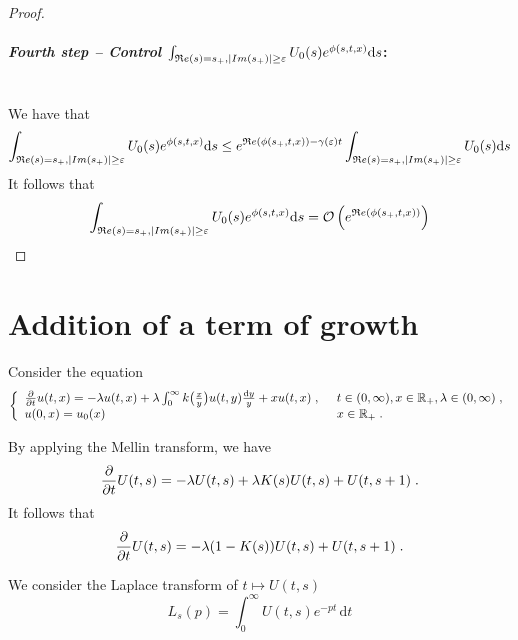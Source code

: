 \documentclass[11pt]{amsart}
\renewcommand{\Re}{\mathfrak{R}e}
\newcommand{\diff}{\,\mathrm{d}}
\begin{document}
\begin{proof}
\medskip
\paragraph{\textit{Fourth step -- Control $\int_{\Re(s) = s_+, |Im(s_+)| \geq \varepsilon} U_0(s) e^{\phi(s, t, x)} \ds$}:}\mbox{}\\
We have that 
\begin{align*}
    \int_{\Re(s) = s_+, |Im(s_+)| \geq \varepsilon} U_0(s) e^{\phi(s, t, x)}
    \ds 
    &\leq  e^{\Re(\phi(s_+, t, x)) - \gamma(\varepsilon)t} \int_{\Re(s) = s_+, |Im(s_+)| \geq \varepsilon} U_0(s) \ds \\
\end{align*}
It follows that 
\begin{align*}
    \int_{\Re(s) = s_+, |Im(s_+)| \geq \varepsilon} U_0(s) e^{\phi(s, t, x)} 
    \ds = \Ocal \left( e^{\Re(\phi(s_+, t, x))} \right)
\end{align*}
\end{proof}


\section{Addition of a term of growth}

Consider the equation
\begin{equation*}\left\{
    \begin{array}{ll}
	\frac{\partial}{\partial t}u(t,x) = - \lambda u(t,x) + \lambda \int_{0}^{\infty} k\big( \frac{x}{y}\big)u(t,y) \frac{\mathrm dy}{y} + xu(t,x)
	\; , \enspace
	& t \in (0, \infty), x \in \mathbb{R}_+, \lambda \in (0, \infty) \; ,
	\\
	u(0, x) = u_0(x)
	& x \in \mathbb{R}_+
	\; .
    \end{array}
	\right.
\end{equation*}

By applying the Mellin transform, we have
	\begin{equation*}
		\frac{\partial}{\partial t} U(t,s) = - \lambda U(t,s) + \lambda K(s) U(t,s) + U(t,s+1)
		\; .
	\end{equation*}
It follows that
    \begin{equation}
        \frac{\partial}{\partial t} U(t,s) = - \lambda (1-K(s)) U(t,s) + U(t,s+1)
		\; .
        \label{eq:addgrowth}
    \end{equation}

We consider the Laplace transform of $t \mapsto U(t,s)$
$$ L_s(p) = \int_0^\infty U(t,s)e^{-pt}\diff t$$ 
\end{document}
